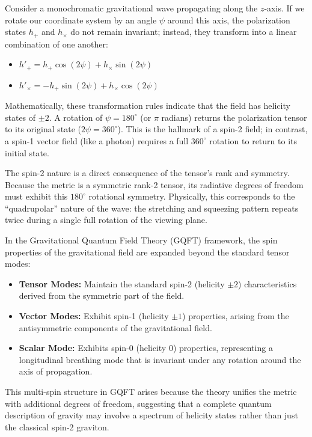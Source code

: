 Consider a monochromatic gravitational wave propagating along the $z$-axis. If we rotate our coordinate system by an angle $\psi$ around this axis, the polarization states $h_+$ and $h_\times$ do not remain invariant; instead, they transform into a linear combination of one another:
\begin{itemize}
  \item $h'_+ = h_+ \cos(2\psi) + h_\times \sin(2\psi)$
  \item $h'_\times = -h_+ \sin(2\psi) + h_\times \cos(2\psi)$
\end{itemize}
Mathematically, these transformation rules indicate that the field has helicity states of $\pm 2$. A rotation of $\psi = 180^\circ$ (or $\pi$ radians) returns the polarization tensor to its original state ($2\psi = 360^\circ$). This is the hallmark of a spin-2 field; in contrast, a spin-1 vector field (like a photon) requires a full $360^\circ$ rotation to return to its initial state.

The spin-2 nature is a direct consequence of the tensor's rank and symmetry. Because the metric is a symmetric rank-2 tensor, its radiative degrees of freedom must exhibit this $180^\circ$ rotational symmetry. Physically, this corresponds to the ``quadrupolar'' nature of the wave: the stretching and squeezing pattern repeats twice during a single full rotation of the viewing plane.

In the Gravitational Quantum Field Theory (GQFT) framework, the spin properties of the gravitational field are expanded beyond the standard tensor modes:
\begin{itemize}
  \item \textbf{Tensor Modes:} Maintain the standard spin-2 (helicity $\pm 2$) characteristics derived from the symmetric part of the field.
  \item \textbf{Vector Modes:} Exhibit spin-1 (helicity $\pm 1$) properties, arising from the antisymmetric components of the gravitational field.
  \item \textbf{Scalar Mode:} Exhibits spin-0 (helicity 0) properties, representing a longitudinal breathing mode that is invariant under any rotation around the axis of propagation.
\end{itemize}
This multi-spin structure in GQFT arises because the theory unifies the metric with additional degrees of freedom, suggesting that a complete quantum description of gravity may involve a spectrum of helicity states rather than just the classical spin-2 graviton.

